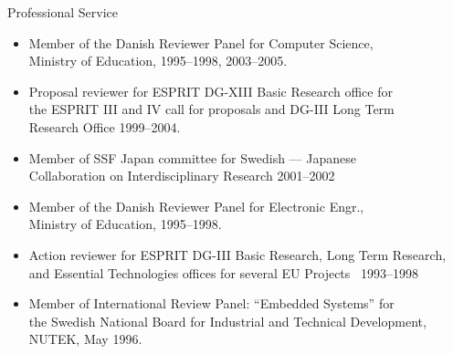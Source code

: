 \documentclass{article}
\begin{document}
\begin{cv}
\begin{cvlist}{Professional Service}
\begin{itemize}
 \item Member of the Danish Reviewer Panel for Computer Science,\\
   Ministry of Education, \cftdotfill{\cftdotsep}  1995--1998, 2003--2005.
 \item Proposal reviewer for ESPRIT DG-XIII Basic Research office for\\
   the ESPRIT III and IV call for proposals and DG-III Long Term\\
   Research Office \cftdotfill{\cftdotsep}  1999--2004.
 \item Member of SSF Japan committee for Swedish --- Japanese\\
   Collaboration on Interdisciplinary Research \cftdotfill{\cftdotsep}
   2001--2002
 \item Member of the Danish Reviewer Panel for Electronic Engr.,\\
   Ministry of Education, \cftdotfill{\cftdotsep}  1995--1998.
 \item Action reviewer for ESPRIT DG-III Basic Research, Long Term
   Research,\\ and Essential Technologies offices for several EU
   Projects\ \cftdotfill{\cftdotsep} 1993--1998
 \item Member of International Review Panel: ``Embedded Systems'' for\\
   the Swedish National Board for Industrial and Technical Development,\\
   NUTEK, \cftdotfill{\cftdotsep} May 1996.
 \end{itemize}
\end{cvlist}


\end{cv}
\end{document}
